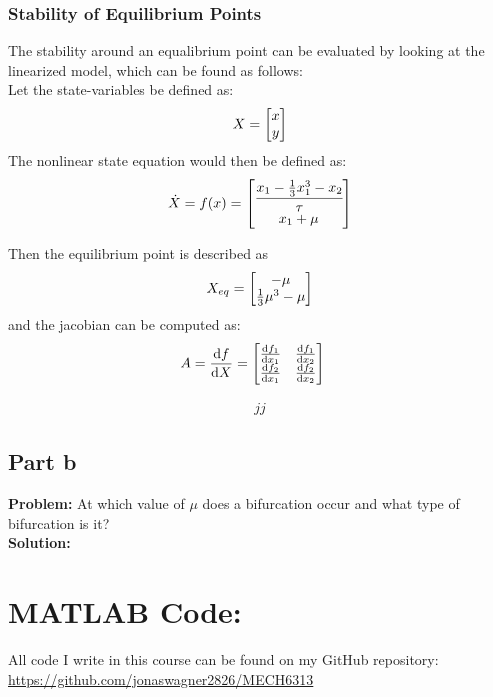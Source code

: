 \documentclass[letter]{article}
\begin{document}
\newpage
\subsubsection{Stability of Equilibrium Points}
The stability around an equalibrium point can be evaluated by looking at the linearized model, which can be found as follows:\\

Let the state-variables be defined as:
$$X = \mqty[x\\ y]$$
The nonlinear state equation would then be defined as:
\begin{equation}
	\dot{X} = f(x) 
	= \mqty[\cfrac{x_1 - \frac{1}{3} x_1^3 - x_2}{\tau}\\
			x_1 + \mu]
\end{equation}

Then the equilibrium point is described as
$$X_{eq} = \mqty[-\mu\\ \frac{1}{3} \mu^3 - \mu]$$
and the jacobian can be computed as:
\begin{align}
	A = \dv{f}{X} &= \mqty[\dv{f_1}{x_1} &\dv{f_1}{x_2}\\ \dv{f_2}{x_1} & \dv{f_2}{x_2}]
\end{align}


\begin{align}
	jj
\end{align}






\newpage
\subsection{Part b}
\textbf{Problem:}
At which value of $\mu$ does a bifurcation occur and what type of bifurcation is it?\\

\noindent
\textbf{Solution:}




\newpage
\appendix
\section{MATLAB Code:}\label{apx:matlab}
All code I write in this course can be found on my GitHub repository:\\
\href{https://github.com/jonaswagner2826/MECH6313}{https://github.com/jonaswagner2826/MECH6313}
%
\end{document}
